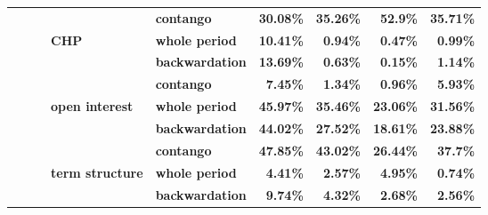 \documentclass[
  authoryear,
  preprint,
  3p]{elsarticle}
\begin{document}
\begin{longtable}[t]{>{}l>{}l>{}l>{}l>{}l>{}r>{}r>{}r>{}r}
\textbf{} & \textbf{} & \textbf{} & \textbf{} & \textbf{contango} & \textcolor[HTML]{4285f4}{\textbf{30.08\%}} & \textcolor[HTML]{4285f4}{\textbf{35.26\%}} & \textcolor[HTML]{4285f4}{\textbf{52.9\%}} & \textcolor[HTML]{4285f4}{\textbf{35.71\%}}\\
\textbf{} & \textbf{} & \textbf{} & \textbf{CHP} & \textbf{whole period} & \textcolor[HTML]{4285f4}{\textbf{10.41\%}} & \textcolor[HTML]{4285f4}{\textbf{0.94\%}} & \textcolor[HTML]{4285f4}{\textbf{0.47\%}} & \textcolor[HTML]{4285f4}{\textbf{0.99\%}}\\
\addlinespace
\textbf{} & \textbf{} & \textbf{} & \textbf{} & \textbf{backwardation} & \textcolor[HTML]{4285f4}{\textbf{13.69\%}} & \textcolor[HTML]{4285f4}{\textbf{0.63\%}} & \textcolor[HTML]{4285f4}{\textbf{0.15\%}} & \textcolor[HTML]{4285f4}{\textbf{1.14\%}}\\
\textbf{} & \textbf{} & \textbf{} & \textbf{} & \textbf{contango} & \textcolor[HTML]{4285f4}{\textbf{7.45\%}} & \textcolor[HTML]{4285f4}{\textbf{1.34\%}} & \textcolor[HTML]{4285f4}{\textbf{0.96\%}} & \textcolor[HTML]{4285f4}{\textbf{5.93\%}}\\
\textbf{} & \textbf{} & \textbf{} & \textbf{open interest} & \textbf{whole period} & \textcolor[HTML]{4285f4}{\textbf{45.97\%}} & \textcolor[HTML]{4285f4}{\textbf{35.46\%}} & \textcolor[HTML]{4285f4}{\textbf{23.06\%}} & \textcolor[HTML]{4285f4}{\textbf{31.56\%}}\\
\textbf{} & \textbf{} & \textbf{} & \textbf{} & \textbf{backwardation} & \textcolor[HTML]{4285f4}{\textbf{44.02\%}} & \textcolor[HTML]{4285f4}{\textbf{27.52\%}} & \textcolor[HTML]{4285f4}{\textbf{18.61\%}} & \textcolor[HTML]{4285f4}{\textbf{23.88\%}}\\
\textbf{} & \textbf{} & \textbf{} & \textbf{} & \textbf{contango} & \textcolor[HTML]{4285f4}{\textbf{47.85\%}} & \textcolor[HTML]{4285f4}{\textbf{43.02\%}} & \textcolor[HTML]{4285f4}{\textbf{26.44\%}} & \textcolor[HTML]{4285f4}{\textbf{37.7\%}}\\
\addlinespace
\textbf{} & \textbf{} & \textbf{} & \textbf{term structure} & \textbf{whole period} & \textcolor[HTML]{4285f4}{\textbf{4.41\%}} & \textcolor[HTML]{4285f4}{\textbf{2.57\%}} & \textcolor[HTML]{4285f4}{\textbf{4.95\%}} & \textcolor[HTML]{4285f4}{\textbf{0.74\%}}\\
\textbf{} & \textbf{} & \textbf{} & \textbf{} & \textbf{backwardation} & \textcolor[HTML]{4285f4}{\textbf{9.74\%}} & \textcolor[HTML]{4285f4}{\textbf{4.32\%}} & \textcolor[HTML]{4285f4}{\textbf{2.68\%}} & \textcolor[HTML]{4285f4}{\textbf{2.56\%}}\\

\end{longtable}
\end{document}
